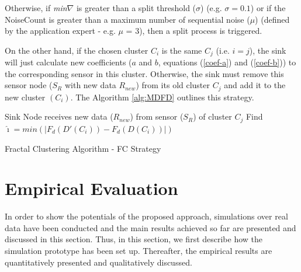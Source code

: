 \documentclass{acm_proc_article-sp}
\begin{document}
Otherwise, if {\it min}$\nabla$ is greater than a split threshold ($\sigma$)
(e.g. $\sigma = 0.1$) or if the NoiseCount is greater than a maximum number of
sequential noise ($\mu$) (defined by the application expert - e.g. $\mu$ = 3),
then a split process is triggered.
\vspace*{-.3cm}

On the other hand, if the chosen cluster $C_i$ is the same $C_j$ (i.e.
$i=j$), the sink will just calculate new coefficients ($a$ and $b$, equations
(\ref{coef-a}) and (\ref{coef-b})) to the corresponding sensor in this cluster.
Otherwise, the sink must remove this sensor node ($S_{R}$ with new data
$R_{new}$) from its old cluster $C_j$ and add it to the new cluster $(C_i)$.
The Algorithm \ref{alg:MDFD} outlines this strategy.

\begin{algorithm}
 \SetAlgoLined
 \LinesNumbered
 \small
 Sink Node receives new data ($R_{new}$) from sensor ($S_{R}$) of cluster $C_j$\;
  Find $\hat{\imath} = min(|F_d(D'(C_i)) - F_d(D(C_i))|)$\;
 \caption{Fractal Clustering Algorithm - FC Strategy}
 \label{alg:MDFD}
\end{algorithm}


\section{Empirical Evaluation}
\label{eval}

In order to show the potentials of the proposed approach, simulations over real
data have been conducted and the main results achieved so far are presented and
discussed in this section. Thus, in this section, we first describe how the
simulation prototype has been set up. Thereafter, the empirical results are
quantitatively presented and qualitatively discussed.
\end{document}
